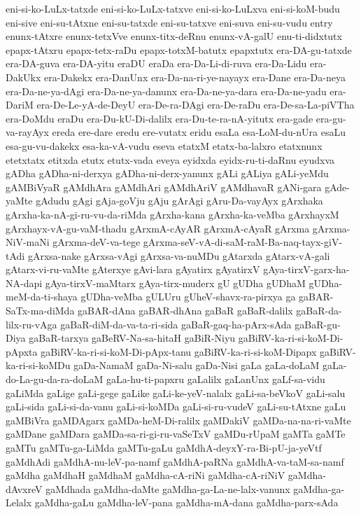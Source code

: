 {eni-si-ko-LuLx-tatxde
eni-si-ko-LuLx-tatxve
eni-si-ko-LuLxva
eni-si-koM-budu
eni-sive
eni-su-tAtxne
eni-su-tatxde
eni-su-tatxve
eni-suva
eni-su-vudu
entry
enunx-tAtxre
enunx-tetxVve
enunx-titx-deRnu
enunx-vA-galU
enu-ti-didxtutx
epapx-tAtxru
epapx-tetx-raDu
epapx-totxM-batutx
epapxtutx
era-DA-gu-tatxde
era-DA-guva
era-DA-yitu
eraDU
eraDa
era-Da-Li-di-ruva
era-Da-Lidu
era-DakUkx
era-Dakekx
era-DanUnx
era-Da-na-ri-ye-nayayx
era-Dane
era-Da-neya
era-Da-ne-ya-dAgi
era-Da-ne-ya-danunx
era-Da-ne-ya-dara
era-Da-ne-yadu
era-DariM
era-De-Le-yA-de-DeyU
era-De-ra-DAgi
era-De-raDu
era-De-sa-La-piVTha
era-DoMdu
eraDu
era-Du-kU-Di-dalilx
era-Du-te-ra-nA-yitutx
era-gade
era-gu-va-rayAyx
ereda
ere-dare
eredu
ere-vutatx
eridu
esaLa
esa-LoM-du-nUra
esaLu
esa-gu-vu-dakekx
esa-ka-vA-vudu
eseva
etatxM
etatx-ba-lalxro
etatxnunx
etetxtatx
etitxda
etutx
etutx-vada
eveya
eyidxda
eyidx-ru-ti-daRnu
eyudxva
gADha
gADha-ni-derxya
gADha-ni-derx-yanunx
gALi
gALiya
gALi-yeMdu
gAMBiVyaR
gAMdhAra
gAMdhAri
gAMdhAriV
gAMdhavaR
gANi-gara
gAde-yaMte
gAdudu
gAgi
gAja-goVju
gAju
gArAgi
gAru-Da-vayAyx
gArxhaka
gArxha-ka-nA-gi-ru-vu-da-riMda
gArxha-kana
gArxha-ka-veMba
gArxhayxM
gArxhayx-vA-gu-vaM-thadu
gArxmA-cAyAR
gArxmA-cAyaR
gArxma
gArxma-NiV-maNi
gArxma-deV-va-tege
gArxma-seV-vA-di-saM-raM-Ba-naq-tayx-giV-tAdi
gArxsa-nake
gArxsa-vAgi
gArxsa-va-nuMDu
gAtarxda
gAtarx-vA-gali
gAtarx-vi-ru-vaMte
gAterxye
gAvi-lara
gAyatirx
gAyatirxV
gAya-tirxV-garx-ha-NA-dapi
gAya-tirxV-maMtarx
gAya-tirx-muderx
gU
gUDha
gUDhaM
gUDha-meM-da-ti-shaya
gUDha-veMba
gULUru
gUheV-shavx-ra-pirxya
ga
gaBAR-SaTx-ma-diMda
gaBAR-dAna
gaBAR-dhAna
gaBaR
gaBaR-dalilx
gaBaR-da-lilx-ru-vAga
gaBaR-diM-da-va-ta-ri-sida
gaBaR-gaq-ha-pArx-sAda
gaBaR-gu-Diya
gaBaR-tarxya
gaBeRV-Na-sa-hitaH
gaBiR-Niyu
gaBiRV-ka-ri-si-koM-Di-pApxta
gaBiRV-ka-ri-si-koM-Di-pApx-tanu
gaBiRV-ka-ri-si-koM-Dipapx
gaBiRV-ka-ri-si-koMDu
gaDa-NamaM
gaDa-Ni-salu
gaDa-Nisi
gaLa
gaLa-doLaM
gaLa-do-La-gu-da-ra-doLaM
gaLa-hu-ti-papxru
gaLalilx
gaLanUnx
gaLf-sa-vidu
gaLiMda
gaLige
gaLi-gege
gaLike
gaLi-ke-yeV-nalalx
gaLi-sa-beVkoV
gaLi-salu
gaLi-sida
gaLi-si-da-vanu
gaLi-si-koMDa
gaLi-si-ru-vudeV
gaLi-su-tAtxne
gaLu
gaMBiVra
gaMDAgarx
gaMDa-heM-Di-ralilx
gaMDakiV
gaMDa-na-na-ri-vaMte
gaMDane
gaMDara
gaMDa-sa-ri-gi-ru-vaSeTxV
gaMDu-rUpaM
gaMTa
gaMTe
gaMTu
gaMTu-ga-LiMda
gaMTu-gaLu
gaMdhA-deyxY-ra-Bi-pU-ja-yeVtf
gaMdhAdi
gaMdhA-nu-leV-pa-namf
gaMdhA-paRNa
gaMdhA-va-taM-sa-namf
gaMdha
gaMdhaH
gaMdhaM
gaMdha-cA-riNi
gaMdha-cA-riNiV
gaMdha-dAvxreV
gaMdhada
gaMdha-daMte
gaMdha-ga-La-ne-lalx-vanunx
gaMdha-ga-Lelalx
gaMdha-gaLu
gaMdha-leV-pana
gaMdha-mA-dana
gaMdha-parx-sAda
}
